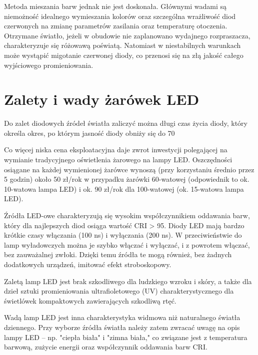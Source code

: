 \documentclass[12pt,a4paper]{book}
\begin{document}
Metoda mieszania barw jednak nie jest doskonała. Głównymi wadami są niemożność idealnego wymieszania kolorów oraz szczególna wrażliwość diod czerwonych na zmianę parametrów zasilania oraz temperaturę otoczenia. Otrzymane światło, jeżeli w obudowie nie zaplanowano wydajnego rozpraszacza, charakteryzuje się różowawą poświatą. Natomiast w niestabilnych warunkach może wystąpić migotanie czerwonej diody, co przenosi się na złą jakość całego wyjściowego promieniowania.

\section*{Zalety i wady żarówek LED}

Do zalet diodowych źródeł światła zaliczyć można długi czas życia diody, który określa okres, po którym jasność diody obniży się do 70%

Co więcej niska cena eksploatacyjna daje zwrot inwestycji polegającej na wymianie tradycyjnego oświetlenia żarowego na lampy LED. Oszczędności osiągane na każdej wymienionej żarówce wynoszą (przy korzystaniu średnio przez 5 godzin) około 50 zł/rok w przypadku żarówki 60-watowej (odpowiednik to ok. 10-watowa lampa LED) i ok. 90 zł/rok dla 100-watowej (ok. 15-watowa lampa LED).

Źródła LED-owe charakteryzują się wysokim współczynnikiem oddawania barw, który dla najlepszych diod osiąga wartość CRI > 95. Diody LED mają bardzo krótkie czasy włączania (100 ns) i wyłączania (200 ns). W przeciwieństwie do lamp wyładowczych można je szybko włączać i wyłączać, i z powrotem włączać, bez zauważalnej zwłoki. Dzięki temu źródła te mogą również, bez żadnych dodatkowych urządzeń, imitować efekt stroboskopowy.

Zaletą lamp LED jest brak szkodliwego dla ludzkiego wzroku i skóry, a także dla dzieł sztuki promieniowania ultrafioletowego (UV) charakterystycznego dla świetlówek kompaktowych zawierających szkodliwą rtęć.

Wadą lamp LED jest inna charakterystyka widmowa niż naturalnego światła dziennego. Przy wyborze źródła światła należy zatem zwracać uwagę na opis lampy LED – np. "ciepła biała" i "zimna biała," co związane jest z temperatura barwową, zużycie energii oraz współczynnik oddawania barw CRI.

\tableofcontents

\listoffigures
\end{document}
